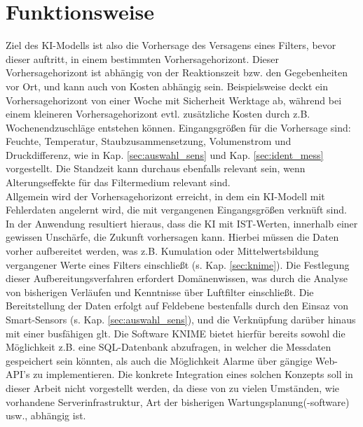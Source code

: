     \section{Funktionsweise}
    \label{sec:funktionsweise}
    Ziel des KI-Modells ist also die Vorhersage des Versagens eines Filters, bevor dieser auftritt, in einem bestimmten Vorhersagehorizont. Dieser Vorhersagehorizont ist abhängig von der Reaktionszeit bzw. den Gegebenheiten vor Ort, und kann auch von Kosten abhängig sein. Beispielsweise deckt ein Vorhersagehorizont von einer Woche mit Sicherheit Werktage ab, während bei einem kleineren Vorhersagehorizont evtl. zusätzliche Kosten durch z.B. Wochenendzuschläge entstehen können.
    Eingangsgrößen für die Vorhersage sind: Feuchte, Temperatur, Staubzusammensetzung, Volumenstrom und Druckdifferenz, wie in Kap. \ref{sec:auswahl_sens} und Kap. \ref{sec:ident_mess} vorgestellt. Die Standzeit kann durchaus ebenfalls relevant sein, wenn Alterungseffekte für das Filtermedium relevant sind. \\
    Allgemein wird der Vorhersagehorizont erreicht, in dem ein KI-Modell mit Fehlerdaten angelernt wird, die mit vergangenen Eingangsgrößen verknüft sind. In der Anwendung resultiert hieraus, dass die KI mit IST-Werten, innerhalb einer gewissen Unschärfe, die Zukunft vorhersagen kann. Hierbei müssen die Daten vorher aufbereitet werden, was z.B. Kumulation oder Mittelwertsbildung vergangener Werte eines Filters einschließt (s. Kap. \ref{sec:knime}). Die Festlegung dieser Aufbereitungsverfahren erfordert Domänenwissen, was durch die Analyse von bisherigen Verläufen und Kenntnisse über Luftfilter einschließt. Die Bereitstellung der Daten erfolgt auf Feldebene bestenfalls durch den Einsaz von Smart-Sensors (s. Kap. \ref{sec:auswahl_sens}), und die Verknüpfung darüber hinaus mit einer busfähigen \ac{glt}. Die Software \ac{KNIME} bietet hierfür bereits sowohl die Möglichkeit z.B. eine SQL-Datenbank abzufragen, in welcher die Messdaten gespeichert sein könnten, als auch die Möglichkeit Alarme über gängige Web-API's zu implementieren. Die konkrete Integration eines solchen Konzepts soll in dieser Arbeit nicht vorgestellt werden, da diese von zu vielen Umständen, wie vorhandene Serverinfrastruktur, Art der bisherigen Wartungsplanung(-software) usw., abhängig ist.